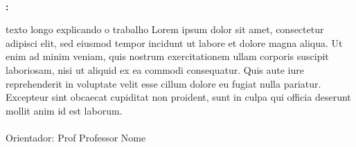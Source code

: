 \begin{center}

    \thispagestyle{pretext}
    \ \\ 

    \begin{large}
        \printAuthors
    \end{large}
    

    \vfill

    \begin{Large}
        \textbf{\uppercase\expandafter{\TitleName}:} \\
        \textbf{\uppercase\expandafter{\SubtitleName}}
    \end{Large}

\end{center}

\vspace{3em}

\begin{adjustwidth}{7.5cm}{}
    \noindent texto longo explicando o trabalho Lorem ipsum dolor sit amet, consectetur adipisci elit, sed eiusmod tempor incidunt ut labore et dolore magna aliqua. Ut enim ad minim veniam, quis nostrum exercitationem ullam corporis suscipit laboriosam, nisi ut aliquid ex ea commodi consequatur. Quis aute iure reprehenderit in voluptate velit esse cillum dolore eu fugiat nulla pariatur. Excepteur sint obcaecat cupiditat non proident, sunt in culpa qui officia deserunt mollit anim id est laborum. \\ \ \\
    Orientador: Prof Professor Nome
\end{adjustwidth}

\vfill

\begin{center}
    \begin{large}
        \printCity \\
        \the \year
    \end{large}
\end{center}

\newpage